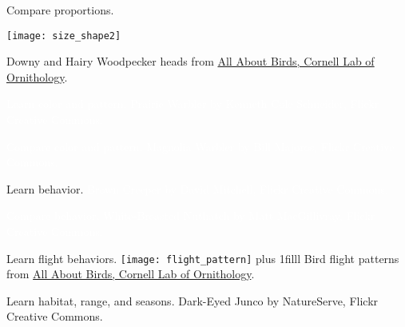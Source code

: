 \documentclass[t]{beamer}
\begin{document}
\begin{frame}[b,plain]{Compare proportions.}
	\begin{center}
		\texttt{[image: size\_shape2]}
	\end{center}
	\tiny Downy and Hairy Woodpecker heads from \href{http://allaboutbirds.com}{All About Birds, Cornell Lab of Ornithology}.
\end{frame}


{
\begin{frame}[b,plain]{\hfill\textcolor{white}{Learn color and pattern.}}
	\tiny\textcolor{white}{Prairie Warbler by Kenneth Cole Schneider, Flickr Creative Commons.}
\end{frame}
}

{
\begin{frame}[b,plain]{\hfill\textcolor{white}{Compare color and pattern.}}
	\tiny\textcolor{white}{Magnolia Warbler by Bill Majoros, Flickr Creative Commons.}
\end{frame}
}

{
\begin{frame}[b,plain]{Learn behavior.}
	\tiny\hfill\textcolor{white}{Brown Creeper by David Mitchell, Flickr Creative Commons.}
\end{frame}
}

{
\begin{frame}[b,plain]{\hfill\textcolor{white}{Compare behavior.}}
	\tiny\textcolor{white}{White-Breasted Nuthatch by Matt MacGillivray, Flickr Creative Commons.}
\end{frame}
}

{
\begin{frame}[c,plain]{Learn flight behaviors.}
	\texttt{[image: flight\_pattern]}
\vskip0pt plus 1filll	
	\hfill\tiny Bird flight patterns from \href{http://allaboutbirds.com}{All About Birds, Cornell Lab of Ornithology}.
\end{frame}
}

{
\begin{frame}[b,plain]{Learn habitat, range, and seasons.}
	\tiny\hfill Dark-Eyed Junco by NatureServe, Flickr Creative Commons.
\end{frame}
}
\end{document}
